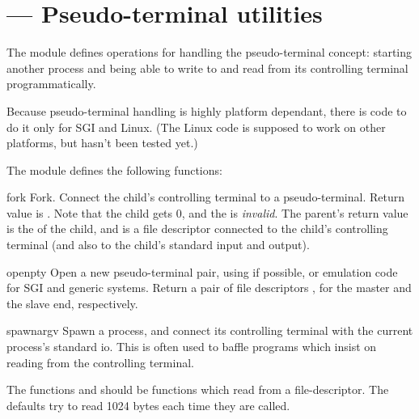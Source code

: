 \section{ ---
         Pseudo-terminal utilities}


The  module defines operations for handling the
pseudo-terminal concept: starting another process and being able to
write to and read from its controlling terminal programmatically.

Because pseudo-terminal handling is highly platform dependant, there
is code to do it only for SGI and Linux. (The Linux code is supposed
to work on other platforms, but hasn't been tested yet.)

The  module defines the following functions:

\begin{funcdesc}{fork}{}
Fork. Connect the child's controlling terminal to a pseudo-terminal.
Return value is . Note that the child 
gets  0, and the  is \emph{invalid}. The parent's
return value is the  of the child, and  is a file
descriptor connected to the child's controlling terminal (and also
to the child's standard input and output).
\end{funcdesc}

\begin{funcdesc}{openpty}{}
Open a new pseudo-terminal pair, using  if
possible, or emulation code for SGI and generic \UNIX{} systems.
Return a pair of file descriptors ,
for the master and the slave end, respectively.
\end{funcdesc}

\begin{funcdesc}{spawn}{argv}
Spawn a process, and connect its controlling terminal with the current 
process's standard io. This is often used to baffle programs which
insist on reading from the controlling terminal.

The functions  and  should be
functions which read from a file-descriptor. The defaults try to read
1024 bytes each time they are called.
\end{funcdesc}
